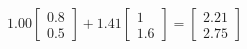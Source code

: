 \documentclass[preview]{standalone}
\begin{document}
\begin{align*}
1.00 \begin{bmatrix} 0.8 \\ 0.5 \end{bmatrix} + 1.41 \begin{bmatrix} 1 \\ 1.6 \end{bmatrix} = \begin{bmatrix} 2.21 \\ 2.75 \end{bmatrix}
\end{align*}
\end{document}
